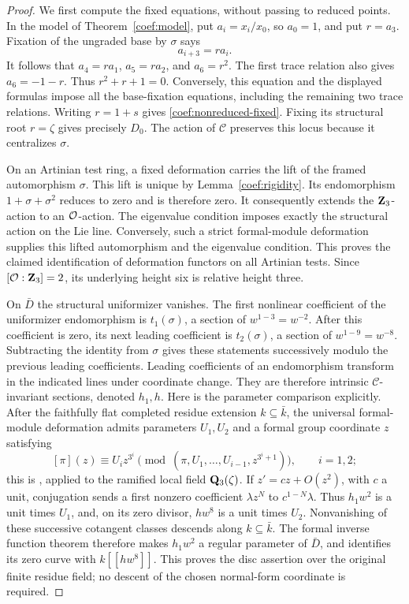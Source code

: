 \begin{proof}
We first compute the fixed equations, without passing to reduced
points.  In the model of Theorem~\ref{coef:model}, put
\(a_i=x_i/x_0\), so \(a_0=1\), and put \(r=a_3\).
Fixation of the ungraded base by \(\sigma\) says
\[
 a_{i+3}=r a_i.
\]
It follows that \(a_4=ra_1\), \(a_5=ra_2\), and \(a_6=r^2\).
The first trace relation also gives \(a_6=-1-r\).  Thus
\(r^2+r+1=0\).  Conversely, this equation and the displayed formulas
impose all the base-fixation equations, including the remaining two
trace relations.  Writing \(r=1+s\) gives
\eqref{coef:nonreduced-fixed}.  Fixing its structural root \(r=\zeta\)
gives precisely \(D_0\).  The action of \(\mathcal C\) preserves this
locus because it centralizes \(\sigma\).

On an Artinian test ring, a fixed deformation carries the lift of
the framed automorphism \(\sigma\).  This lift is unique by
Lemma~\ref{coef:rigidity}.  Its endomorphism
\(1+\sigma+\sigma^2\) reduces to zero and is therefore zero.
It consequently extends the \(\mathbf Z_3\)-action to an
\(\mathcal O\)-action.  The eigenvalue condition imposes exactly the
structural action on the Lie line.  Conversely, such a strict
formal-module deformation supplies this lifted automorphism and
the eigenvalue condition.  This proves the claimed identification
of deformation functors on all Artinian tests.
Since \([\mathcal O:\mathbf Z_3]=2\), its underlying height six is relative
height three.

On \(\bar D\) the structural uniformizer vanishes.  The first
nonlinear coefficient of the uniformizer endomorphism is
\(t_1(\sigma)\), a section of \(w^{1-3}=w^{-2}\).
After this coefficient is zero, its next leading coefficient is
\(t_2(\sigma)\), a section of \(w^{1-9}=w^{-8}\).
Subtracting the identity from \(\sigma\) gives these statements
successively modulo the previous leading coefficients.
Leading coefficients of an endomorphism transform in the indicated
lines under coordinate change.  They are therefore intrinsic
\(\mathcal C\)-invariant sections, denoted \(h_1,h\).
Here is the parameter comparison explicitly.  After the faithfully
flat completed residue extension \(k\subseteq\bar k\), the universal
formal-module deformation admits parameters \(U_1,U_2\) and a formal
group coordinate \(z\) satisfying
\begin{equation}\label{coef:height-coordinates}
 [\pi](z)\equiv U_i z^{3^i}
 \pmod{(\pi,U_1,\ldots,U_{i-1},z^{3^i+1})},
 \qquad i=1,2;
\end{equation}
this is \cite[arXiv version, Section~1, Equation~(1.1)]{StrauchTorsion}, applied to
the ramified local field \(\mathbf Q_3(\zeta)\).
If \(z'=cz+O(z^2)\), with \(c\) a unit, conjugation sends a first
nonzero coefficient \(\lambda z^N\) to \(c^{1-N}\lambda\).
Thus \(h_1w^2\) is a unit times \(U_1\), and, on its zero divisor,
\(hw^8\) is a unit times \(U_2\).
Nonvanishing of these successive cotangent classes descends along
\(k\subseteq\bar k\).  The formal inverse function theorem therefore
makes \(h_1w^2\) a regular parameter of \(\bar D\), and identifies
its zero curve with \(k[[hw^8]]\).  This proves the disc assertion
over the original finite residue field; no descent of the chosen
normal-form coordinate is required.


\end{proof}
